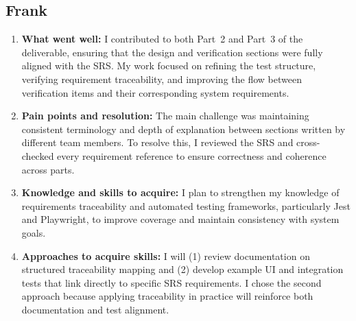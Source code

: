 \documentclass[12pt, titlepage]{article}
\begin{document}
\subsection*{Frank}
\begin{enumerate}
  \item \textbf{What went well:}  
  I contributed to both Part~2 and Part~3 of the deliverable, ensuring that the design and verification
  sections were fully aligned with the SRS. My work focused on refining the test structure, verifying
  requirement traceability, and improving the flow between verification items and their
  corresponding system requirements.

  \item \textbf{Pain points and resolution:}  
  The main challenge was maintaining consistent terminology and depth of explanation between
  sections written by different team members. To resolve this, I reviewed the SRS and cross-checked
  every requirement reference to ensure correctness and coherence across parts.

  \item \textbf{Knowledge and skills to acquire:}  
  I plan to strengthen my knowledge of requirements traceability and automated testing frameworks,
  particularly Jest and Playwright, to improve coverage and maintain consistency with system goals.

  \item \textbf{Approaches to acquire skills:}  
  I will (1) review documentation on structured traceability mapping and (2) develop example UI
  and integration tests that link directly to specific SRS requirements. I chose the second approach
  because applying traceability in practice will reinforce both documentation and test alignment.
\end{enumerate}
\end{document}

